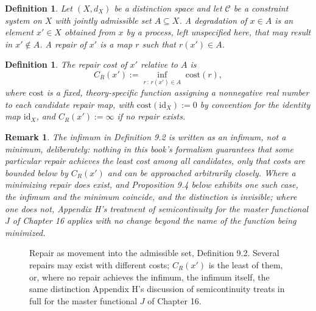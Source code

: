 \documentclass[11pt]{book}
\newtheorem{definition}[theorem]{Definition}
\newtheorem{remark}[theorem]{Remark}
\begin{document}
\begin{definition}
Let $(X, d_X)$ be a distinction space and let $\mathcal C$ be a constraint system on $X$ with jointly admissible set $A \subseteq X$. A \emph{degradation} of $x \in A$ is an element $x' \in X$ obtained from $x$ by a process, left unspecified here, that may result in $x' \notin A$. A \emph{repair} of $x'$ is a map $r$ such that $r(x') \in A$.
\end{definition}

\begin{definition}
The \emph{repair cost} of $x'$ relative to $A$ is
\[
C_R(x') := \inf_{r \,:\, r(x') \in A} \; \mathrm{cost}(r),
\]
where $\mathrm{cost}$ is a fixed, theory-specific function assigning a nonnegative real number to each candidate repair map, with $\mathrm{cost}(\mathrm{id}_X) := 0$ by convention for the identity map $\mathrm{id}_X$, and $C_R(x') := \infty$ if no repair exists.
\end{definition}

\begin{remark}
The infimum in Definition 9.2 is written as an infimum, not a minimum, deliberately: nothing in this book's formalism guarantees that some particular repair achieves the least cost among all candidates, only that costs are bounded below by $C_R(x')$ and can be approached arbitrarily closely. Where a minimizing repair does exist, and Proposition 9.4 below exhibits one such case, the infimum and the minimum coincide, and the distinction is invisible; where one does not, Appendix H's treatment of semicontinuity for the master functional $J$ of Chapter 16 applies with no change beyond the name of the function being minimized.
\end{remark}

\begin{figure}[htb]
\centering
{}
\caption{Repair as movement into the admissible set, Definition 9.2. Several repairs may exist with different costs; $C_R(x')$ is the least of them, or, where no repair achieves the infimum, the infimum itself, the same distinction Appendix H's discussion of semicontinuity treats in full for the master functional $J$ of Chapter 16.}
\label{fig:repair-cost}
\end{figure}
\end{document}
